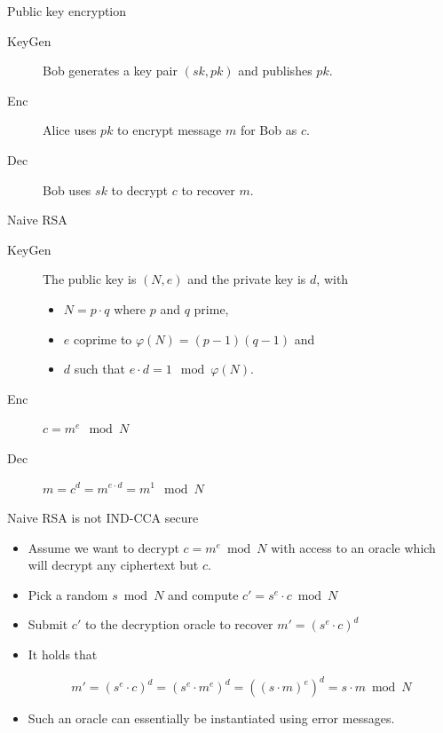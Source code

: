 \documentclass[presentation,smaller]{beamer}
\begin{document}
\begin{frame}[label={sec:orgd9276f5}]{Public key encryption}
\begin{description}
\item[{KeyGen}] Bob generates a key pair \alert{\((sk, pk)\)} and publishes \alert{\(pk\)}.

\item[{Enc}] Alice uses \alert{\(pk\)} to encrypt message \alert{\(m\)} for Bob as \alert{\(c\)}.

\item[{Dec}] Bob uses \alert{\(sk\)} to decrypt \alert{\(c\)} to recover \alert{\(m\)}.
\end{description}
\end{frame}

\begin{frame}[label={sec:org6023a3d}]{Naive RSA}
\begin{description}
\item[{KeyGen}] The public key is \((N,e)\) and the private key is \(d\), with

\begin{itemize}
\item \(N = p⋅q\) where \(p\) and \(q\) prime,
\item \(e\) coprime to \(φ(N) = (p-1)(q-1)\) and
\item \(d\) such that \(e⋅ d = 1 \mod{φ(N)}\).
\end{itemize}

\item[{Enc}] \(c = m^e \mod{N}\)

\item[{Dec}] \(m = c^d = m^{e\cdot d} = m^{1} \mod{N}\)
\end{description}
\end{frame}

\begin{frame}[label={sec:org5f0bde3}]{Naive RSA is not IND-CCA secure}
\begin{itemize}[<+->]
\item Assume we want to decrypt \(c = m^e \bmod N\) with access to an oracle which will decrypt any ciphertext but \(c\).

\item Pick a random \(s \bmod N\) and compute \(c' = s^e ⋅ c \bmod N\)

\item Submit \(c'\) to the decryption oracle to recover \(m' = {\left(s^e ⋅ c\right)}^d\)

\item It holds that

\[m' = {\left(s^e ⋅ c\right)}^d = {\left(s^e ⋅ m^e\right)}^d = {\left({\left(s⋅m\right)}^e \right)}^d = s⋅m \bmod N\]

\item Such an oracle can essentially be instantiated using error messages. 
\end{itemize}
\end{frame}
\end{document}
